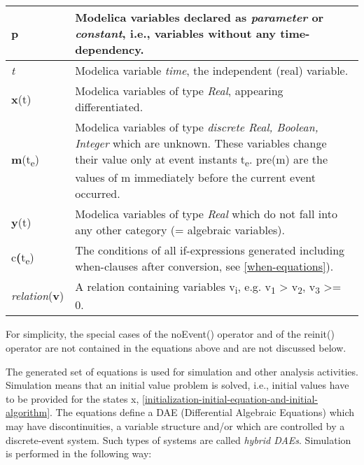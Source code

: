 \begin{longtable}[]{|p{2cm}|p{12cm}|}
\hline \endhead
\textbf{p} & Modelica variables declared as \emph{parameter} or
\emph{constant}, i.e., variables without any
time-dependency.\\ \hline
\emph{t} & Modelica variable \emph{time}, the independent (real)
variable.\\ \hline
\textbf{x}(t) & Modelica variables of type \emph{Real}, appearing
differentiated.\\ \hline
\textbf{m}(t\textsubscript{e}) & Modelica variables of type
\emph{discrete Real, Boolean, Integer} which are unknown. These
variables change their value only at event instants t\textsubscript{e}.
pre(m) are the values of m immediately before the current event
occurred.\\ \hline
\textbf{y}(t) & Modelica variables of type \emph{Real} which do not fall
into any other category (= algebraic variables).\\ \hline
c\textbf{(}t\textsubscript{e}) & The conditions of all if-expressions
generated including when-clauses after conversion, see \autoref{when-equations}).\\ \hline
\emph{relation}(\textbf{v}) & A relation containing variables
v\textsubscript{i}, e.g. v\textsubscript{1} \textgreater{}
v\textsubscript{2}, v\textsubscript{3} \textgreater{}= 0.\\ \hline

\end{longtable}

For simplicity, the special cases of the noEvent() operator and of the
reinit() operator are not contained in the equations above and are not
discussed below.

The generated set of equations is used for simulation and other analysis
activities. Simulation means that an initial value problem is solved,
i.e., initial values have to be provided for the states x, \autoref{initialization-initial-equation-and-initial-algorithm}.
The equations define a DAE (Differential Algebraic Equations) which may
have discontinuities, a variable structure and/or which are controlled
by a discrete-event system. Such types of systems are called
\emph{hybrid DAEs}. Simulation is performed in the following way:

